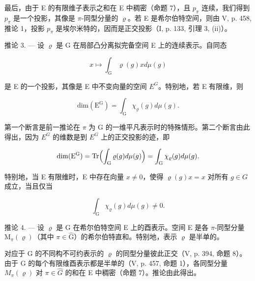 最后，由于 E 的有限维子表示之和在 E 中稠密（命题 7），且 \(p_{\pi}\) 连续，我们得到 \(p_{\pi}\) 是一个投影，其像是 \(\pi\)-同型分量的 \(\varrho\)。若 E 是希尔伯特空间，则由 V, p. 458, 推论 1，投影 \(p_{\pi}\) 是埃尔米特的，因而是正交投影（I, p. 133, 引理 3, (ii)）。

推论 3. --- 设 \(\varrho\) 是 G 在局部凸分离拟完备空间 E 上的连续表示。自同态

\[
x \mapsto \int_ {\mathrm{G}} \varrho (g) x d \mu (g)
\]

是 E 的一个投影，其像是 E 中不变向量的空间 \(E^{G}\)。特别地，若 E 有限维，则

\[
\mathrm{dim} (\mathrm{E} ^ {\mathrm{G}}) = \int_ {\mathrm{G}} \chi_ {\varrho} (g) d \mu (g).
\]

第一个断言是前一推论在 \(\pi\) 为 G 的一维平凡表示时的特殊情形。第二个断言由此得出，因为 \(E^{G}\) 的维数是到 \(E^{G}\) 上的正交投影的迹，即

\[
\mathrm{dim} (\mathrm{E} ^ {\mathrm{G}}) = \mathrm{Tr} \Bigl (\int_ {\mathrm{G}} \varrho (g) d \mu (g) \Bigr) = \int_ {\mathrm{G}} \chi_ {\varrho} (g) d \mu (g).
\]

特别地，当 E 有限维时，E 中存在向量 \(x \neq 0\)，使得 \(\varrho(g)x = x\) 对所有 \(g \in G\) 成立，当且仅当

\[
\int_ {\mathrm{G}} \chi_ {\varrho} (g) d \mu (g) \neq 0.
\]

推论 4. --- 设 \(\varrho\) 是 G 在希尔伯特空间 E 上的酉表示。空间 E 是各 \(\pi\)-同型分量 \(\mathrm{M}_{\pi}(\varrho)\)（其中 \(\pi \in \widehat{\mathrm{G}}\)）的希尔伯特直和。特别地，表示 \(\varrho\) 是半单的。

对应于 G 的不同构不可约表示的 \(\varrho\) 的同型分量彼此正交（V, p. 394, 命题 8）。由于 G 的每个有限维酉表示都是半单的（V, p. 457, 命题 1），各同型分量 \(M_{\pi}(\varrho)\) 对 \(\pi \in \widehat{G}\) 的和在 E 中稠密（命题 7）。推论由此得出。
\relax{}
